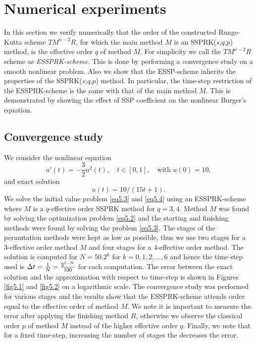 \section{Numerical experiments}\label{sec:numerics}

In this section we verify numerically that the order of the constructed Runge-Kutta scheme $TM^{n-2}R$, for which the main method $M$ is an SSPRK($s$,$q$,$p$) method, is the effective order $q$ of method $M$. For simplicity we call the $TM^{n-2}R$ scheme as \emph{ESSPRK-scheme}. This is done by performing a convergence study on a smooth nonlinear problem. Also we show that the ESSP-scheme inherits the properties of the SSPRK($s$,$q$,$p$) method. In particular, the time-step restriction of the ESSPRK-scheme is the same with that of the main method $M$. This is demonstrated by showing the effect of SSP coefficient on the nonlinear Burger's equation.

\subsection{Convergence study}\label{subsec:convergence}

We consider the nonlinear equation
\begin{equation}\label{eq5.3}
    u'(t) = -\frac{3}{2}u^{2}(t), \quad t \in [0,1], \quad \text{with } u(0) = 10,
\end{equation}
and exact solution
\begin{equation}\label{eq5.4}
    u(t) = 10/(15t + 1).
\end{equation}
We solve the initial value problem \eqref{eq5.3} and \eqref{eq5.4} using an ESSPRK-scheme where $M$ is a $q$-effective order SSPRK method for $q = 3, 4$. 
Method $M$ was found by solving the optimization problem \eqref{eq5.2} and the starting and finishing methods were found by solving the problem \eqref{eq5.3}. 
The stages of the permutation methods were kept as low as possible, thus we use two stages for a 3-effective order method $M$ and four stages for a 4-effective order method. 
The solution is computed for $N = 50.2^{k}$ for $k = 0, 1, 2, \dots, 6$ and hence the time-step used is $\Delta t = \frac{1}{N} = \frac{2^{1-N}}{100}$ for each computation. 
The error between the exact solution and the approximation with respect to time-step is shown in Figures \ref{fig5.1} and \ref{fig5.2} on a logarithmic scale. 
The convergence study was performed for various stages and the results show that the ESSPRK-scheme attends order equal to the effective order of method $M$. 
We note it is important to measure the error after applying the finishing method $R$, otherwise we observe the
classical order $p$ of method $M$ instead of the higher effective order $q$. 
Finally, we note that for a fixed time-step, increasing the number of stages the decreases the error.

